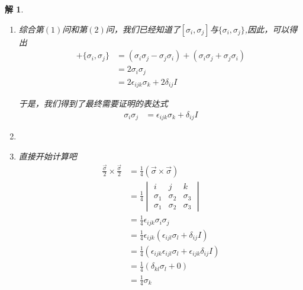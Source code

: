 \documentclass{article}
\newtheorem{solution}{解}
\newcommand{\pmtwo}[4]{
    \begin{pmatrix}
        #1&#2\\
        #3&#4
    \end{pmatrix}
    }
\newcommand{\vmthree}[9]{
    \begin{vmatrix}
        #1&#2&#3\\
        #4&#5&#6\\
        #7&#8&#9
    \end{vmatrix}
}
\begin{document}
\begin{solution}
\begin{enumerate}
        最后是$\{\sigma_1,\sigma_1\}$
        \begin{align*}
            \{\sigma_1,\sigma_1\}&=2\sigma_1\sigma_1\\
            &=2\pmtwo{0}{1}{1}{0}\pmtwo{0}{1}{1}{0}\\
            &=2\pmtwo{1}{0}{0}{1}\\
            &=2I
        \end{align*}
        
        综合以上所计算得到的，我们可以得出一个归纳性结论
        \begin{align*}
            \{\sigma_i,\sigma_j\}=2\delta_{ij}I
        \end{align*}
        \item[(3)] 综合第$(1)$问和第$(2)$问，我们已经知道了$[\sigma_i,\sigma_j]$与$\{\sigma_i,\sigma_j\}$,因此，可以得出
        \begin{align*}
            [\sigma_i,\sigma_j]+\{\sigma_i,\sigma_j\}&=(\sigma_i\sigma_j-\sigma_j\sigma_i)+(\sigma_i\sigma_j+\sigma_j\sigma_i)\\
            &=2\sigma_i\sigma_j\\
            &=2\epsilon_{ijk}\sigma_k+2\delta_{ij}I
        \end{align*}

        于是，我们得到了最终需要证明的表达式
        \begin{align*}
            \sigma_i\sigma_j&=\epsilon_{ijk}\sigma_k+\delta_{ij}I
        \end{align*}
        \item[(4)] 
        \item[(5)] 直接开始计算吧
        \begin{align*}
            \frac{\vec{\sigma}}{2}\times\frac{\vec{\sigma}}{2}&=\frac{1}{4}(\vec{\sigma}\times\vec{\sigma})\\
            &=\frac{1}{4}\vmthree{i}{j}{k}{\sigma_1}{\sigma_2}{\sigma_3}{\sigma_1}{\sigma_2}{\sigma_3}\\
            &=\frac{1}{4}\epsilon_{ijk}\sigma_i\sigma_j\\
            &=\frac{1}{4}\epsilon_{ijk}\left(\epsilon_{ijl}\sigma_l+\delta_{ij}I\right)\\
            &=\frac{1}{4}\left(\epsilon_{ijk}\epsilon_{ijl}\sigma_l+\epsilon_{ijk}\delta_{ij}I\right)\\
            &=\frac{1}{4}\left(\delta_{kl}\sigma_l+0\right)\\
            &=\frac{1}{4}\sigma_k
        \end{align*}
    \end{enumerate}
\end{solution}
\newpage
\end{document}
